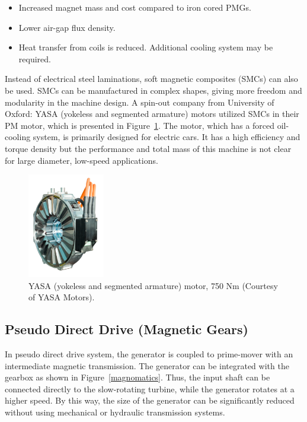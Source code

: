 \documentclass[a4paper, 11pt]{article} %
\begin{document}
\begin{itemize}
	\item Increased magnet mass and cost compared to iron cored PMGs.
	\item Lower air-gap flux density.
	\item Heat transfer from coils is reduced. Additional cooling system may be required.
\end{itemize}

Instead of electrical steel laminations, soft magnetic composites (SMCs) can also be used. SMCs can be manufactured in complex shapes, giving more freedom and modularity in the machine design. A spin-out company from University of Oxford: YASA (yokeless and segmented armature) motors utilized SMCs in their PM motor, which is presented in Figure~\ref{yasa_motor}. The motor, which has a forced oil-cooling system, is primarily designed for electric cars. It has a high efficiency and torque density but the performance and total mass of this machine is not clear for large diameter, low-speed applications.


  \begin{figure}[]
    \centering
    \includegraphics[width=0.3\textwidth]{yasa_motor}
    \caption{YASA (yokeless and segmented armature) motor, 750 Nm (Courtesy of YASA Motors).} 
    \label{yasa_motor}
  \end{figure}

\subsection{Pseudo Direct Drive (Magnetic Gears)}

In pseudo direct drive system, the generator is coupled to prime-mover with an intermediate magnetic transmission. The generator can be integrated with the gearbox as shown in Figure~\ref{magnomatics}. Thus, the input shaft can be connected directly to the slow-rotating turbine, while the generator rotates at a higher speed. By this way, the size of the generator can be significantly reduced without using mechanical or hydraulic transmission systems.
\end{document}
